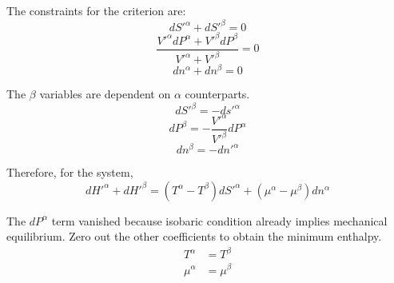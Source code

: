\begin{@empty}
\begin{answer}
    The constraints for the criterion are:
    \[ dS'^\alpha + dS'^\beta = 0 \]
    \[ \frac{V'^\alpha dP^\alpha + V'^\beta dP^\beta}{V'^\alpha + V'^\beta} = 0 \]
    \[ dn^\alpha + dn^\beta = 0 \]

    The $\beta$ variables are dependent on $\alpha$ counterparts.
    \[ dS'^\beta = -ds'^\alpha \]
    \[ dP^\beta = -\frac{V'^\alpha}{V'^\beta} dP^\alpha \]
    \[ dn^\beta = -dn'^\alpha \]

    Therefore, for the system,
    \[
        dH'^\alpha + dH'^\beta
        = \left( T^\alpha - T^\beta \right) dS'^\alpha
        + \left( \mu^\alpha - \mu^\beta \right) dn^\alpha
    \]

    The $dP^\alpha$ term vanished because isobaric condition already implies
    mechanical equilibrium.  Zero out the other coefficients to obtain the
    minimum enthalpy.
    \begin{align*}
        T^\alpha &= T^\beta \tag{thermal equilibrium} \\
        \mu^\alpha &= \mu^\beta \tag{chemical equilibrium}
    \end{align*}
\end{answer}
\end{@empty}
